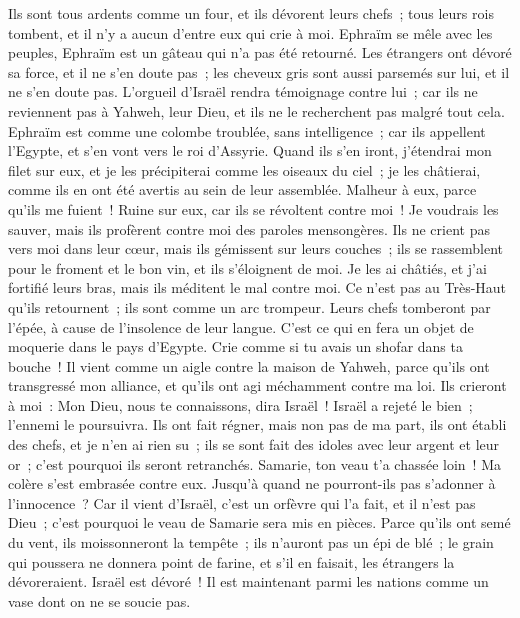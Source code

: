\begin{multicols}{2}
Ils sont tous ardents comme un four, et ils dévorent leurs chefs~; tous leurs rois tombent, et il n'y a aucun d'entre eux qui crie à moi.
Ephraïm se mêle avec les peuples, Ephraïm est un gâteau qui n'a pas été retourné.
Les étrangers ont dévoré sa force, et il ne s'en doute pas~; les cheveux gris sont aussi parsemés sur lui, et il ne s'en doute pas.
L'orgueil d'Israël rendra témoignage contre lui~; car ils ne reviennent pas à Yahweh, leur Dieu, et ils ne le recherchent pas malgré tout cela. 
Ephraïm est comme une colombe troublée, sans intelligence~; car ils appellent l'Egypte, et s'en vont vers le roi d'Assyrie.
Quand ils s'en iront, j'étendrai mon filet sur eux, et je les précipiterai comme les oiseaux du ciel~; je les châtierai, comme ils en ont été avertis au sein de leur assemblée.
Malheur à eux, parce qu'ils me fuient~! Ruine sur eux, car ils se révoltent contre moi~! Je voudrais les sauver, mais ils profèrent contre moi des paroles mensongères.
Ils ne crient pas vers moi dans leur cœur, mais ils gémissent sur leurs couches~; ils se rassemblent pour le froment et le bon vin, et ils s'éloignent de moi.
Je les ai châtiés, et j'ai fortifié leurs bras, mais ils méditent le mal contre moi.
Ce n'est pas au Très-Haut qu'ils retournent~; ils sont comme un arc trompeur. Leurs chefs tomberont par l'épée, à cause de l'insolence de leur langue. C'est ce qui en fera un objet de moquerie dans le pays d'Egypte.
\VerseOne{}Crie comme si tu avais un shofar dans ta bouche~! Il vient comme un aigle contre la maison de Yahweh, parce qu'ils ont transgressé mon alliance, et qu'ils ont agi méchamment contre ma loi.
Ils crieront à moi~: Mon Dieu, nous te connaissons, dira Israël~!
Israël a rejeté le bien~; l'ennemi le poursuivra.
Ils ont fait régner, mais non pas de ma part, ils ont établi des chefs, et je n'en ai rien su~; ils se sont fait des idoles avec leur argent et leur or~; c'est pourquoi ils seront retranchés.
Samarie, ton veau t'a chassée loin~! Ma colère s'est embrasée contre eux. Jusqu'à quand ne pourront-ils pas s'adonner à l'innocence~?
Car il vient d'Israël, c'est un orfèvre qui l'a fait, et il n'est pas Dieu~; c'est pourquoi le veau de Samarie sera mis en pièces.
Parce qu'ils ont semé du vent, ils moissonneront la tempête~; ils n'auront pas un épi de blé~; le grain qui poussera ne donnera point de farine, et s'il en faisait, les étrangers la dévoreraient.
Israël est dévoré~! Il est maintenant parmi les nations comme un vase dont on ne se soucie pas.

\end{multicols}
